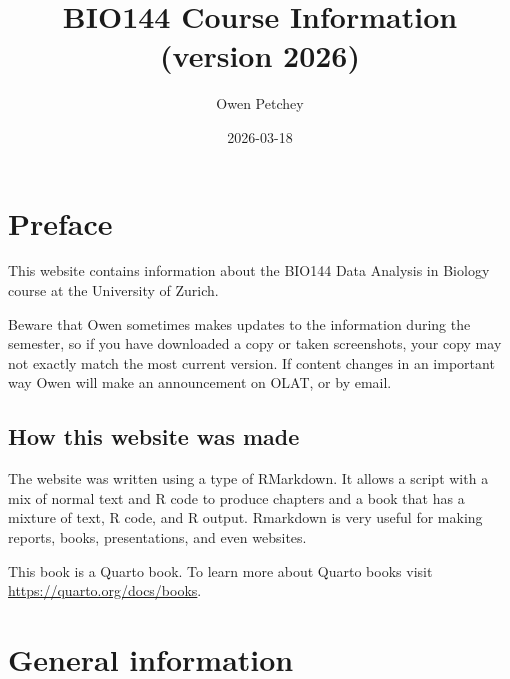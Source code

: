 \documentclass[
  letterpaper,
  8pt,
  a4paper]{book}
\title{BIO144 Course Information (version 2026)}
\author{Owen Petchey}
\date{2026-03-18}
\renewcommand*\contentsname{Table of contents}
\newcommand\contentsname{Table of contents}
\begin{document}
\frontmatter
\maketitle

\renewcommand*\contentsname{Table of contents}
{
\setcounter{tocdepth}{1}
\tableofcontents
}

\mainmatter
{}

\chapter*{Preface}\label{preface}


This website contains information about the BIO144 Data Analysis in
Biology course at the University of Zurich.

Beware that Owen sometimes makes updates to the information during the
semester, so if you have downloaded a copy or taken screenshots, your
copy may not exactly match the most current version. If content changes
in an important way Owen will make an announcement on OLAT, or by email.

\section*{How this website was made}\label{how-this-website-was-made}


The website was written using a type of RMarkdown. It allows a script
with a mix of normal text and R code to produce chapters and a book that
has a mixture of text, R code, and R output. Rmarkdown is very useful
for making reports, books, presentations, and even websites.

This book is a Quarto book. To learn more about Quarto books visit
\url{https://quarto.org/docs/books}.


\chapter*{General information}\label{general-information}

\end{document}
